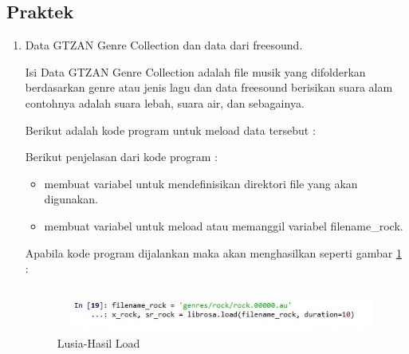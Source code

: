 \subsection{Praktek}
\begin{enumerate}
\item Data GTZAN Genre Collection dan data dari freesound. 
	\par Isi Data GTZAN Genre Collection adalah file musik yang difolderkan berdasarkan genre atau jenis lagu dan data freesound berisikan suara alam contohnya adalah suara lebah, suara air, dan sebagainya.
	\par Berikut adalah kode program untuk meload data tersebut :
	
	\par Berikut penjelasan dari kode program :
	\begin{itemize}
	\item membuat variabel untuk mendefinisikan direktori file yang akan digunakan.
	\item membuat variabel untuk meload atau memanggil variabel filename\_rock.
	\end{itemize}
	
	\par Apabila kode program dijalankan maka akan menghasilkan seperti gambar \ref{6B1} :
		\begin{figure}[!hbtp]
		\centering
		\includegraphics[scale=0.4]{figures/t1.jpg}
		\caption{Lusia-Hasil Load}
		\label{6B1}
		\end{figure}


\end{enumerate}
